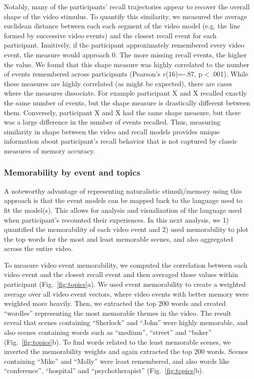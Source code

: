 \documentclass{article}
\begin{document}
{Notably, many of the participants' recall trajectories appear to recover the overall shape of the video stimulus. To quantify this similarity, we measured the average euclidean distance between each each segment of the video model (e.g. the line formed by successive video events) and the closest recall event for each participant.  Inuitively, if the participant approximately remembered every video event, the measure would approach 0. The more missing recall events, the higher the value. We found that this shape measure was highly correlated to the number of events remembered across participants (Pearson's $r$(16)=-.87, p$<$.001). While these measures are highly correlated (as might be expected), there are cases where the measures dissociate.  For example participant X and X recalled exactly the same number of events, but the shape measure is drastically different between them.  Conversely, participant X and X had the same shape measure, but there was a large difference in the number of events recalled. Thus, measuring similarity in shape between the video and recall models provides unique information about participant's recall behavior that is not captured by classic measures of memory accuracy.

\subsubsection{Memorability by event and topics}
A noteworthy advantage of representing naturalistic stimuli/memory using this approach is that the event models can be mapped back to the language used to fit the model(s).  This allows for analysis and visualization of the language used when participant's recounted their experiences.  In this next analysis, we 1) quantified the memorability of each video event and 2) used memorability to plot the top words for the most and least memorable scenes, and also aggregated across the entire video.

To measure video event memorability, we computed the correlation between each video event and the closest recall event and then averaged those values within participant (Fig.~\ref{fig:topics}a). We used event memorability to create a weighted average over all video event vectors, where video events with better memory were weighted more heavily. Then, we extracted the top 200 words and created ``wordles'' representing the most memorable themes in the video. The result reveal that scenes containing ``Sherlock'' and ``John'' were highly memorable, and also scenes containing words such as ``medium'', ``street'' and ``baker'' (Fig.~\ref{fig:topics}b). To find words related to the least memorable scenes, we inverted the memorability weights and again extracted the top 200 words.  Scenes containing ``Mike'' and ``Molly'' were least remembered, and also words like ``conference'', ``hospital'' and ``psychotherapist'' (Fig.~\ref{fig:topics}b).

}
\end{document}
